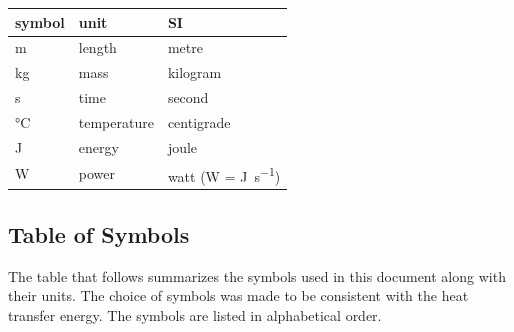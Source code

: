 \documentclass[12pt]{article}
\begin{document}
\renewcommand{\arraystretch}{1.2}
  \noindent \begin{tabular}{l l l} 
    \toprule		
    \textbf{symbol} & \textbf{unit} & \textbf{SI}\\
    \midrule 
    \si{\metre} & length & metre\\
    \si{\kilogram} & mass	& kilogram\\
    \si{\second} & time & second\\
    \si{\celsius} & temperature & centigrade\\
    \si{\joule} & energy & joule\\
    \si{\watt} & power & watt (W = \si{\joule\per\second})\\
    \bottomrule
  \end{tabular}

\subsection{Table of Symbols}

The table that follows summarizes the symbols used in this document along with
their units.  The choice of symbols was made to be consistent with the heat
transfer energy.  The symbols are listed in alphabetical order.
\end{document}
